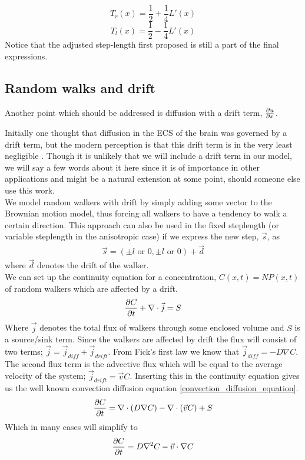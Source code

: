 \begin{equation}\label{farnell_and_gibson_4}
T_r(x) = \frac{1}{2} +\frac{1}{4}L'(x)
\end{equation}
\begin{equation}\label{farnell_and_gibson_5}
T_l(x) = \frac{1}{2} -\frac{1}{4}L'(x)
\end{equation}
Notice that the adjusted step-length first proposed is still a part of the final expressions.


\subsection{Random walks and drift}\label{random_walks_and_drift}

Another point which should be addressed is diffusion with a drift term, $\frac{\partial u}{\partial x}$. 

Initially one thought that diffusion in the ECS of the brain was governed by a drift term, but the modern perception is that this drift term is in the very least negligible \cite{nicholson2001diffusion}. 
Though it is unlikely that we will include a drift term in our model, we will say a few words about it here since it is of importance in other applications and might be a natural extension at some point, should someone else use this work.\\
We model random walkers with drift by simply adding some vector to the Brownian motion model, thus forcing all walkers to have a tendency to walk a certain direction. 
This approach can also be used in the fixed steplength (or variable steplength in the anisotropic case)  if we express the new step, $\vec{s}$, as
\begin{align*}
 \vec{s} = (\pm l \text{ or }0,\pm l \text{ or }0) +\vec{d}
\end{align*}
where $\vec{d}$ denotes the drift of the walker.\\
We can set up the continuity equation for a concentration, $C(x,t) = NP(x,t)$ of random walkers which are affected by a drift.
\begin{equation}
 \frac{\partial C}{\partial t} +\nabla\cdot\vec{j} = S
\end{equation}
Where $\vec{j}$ denotes the total flux of walkers through some enclosed volume and $S$ is a source/sink term. 
Since the walkers are affected by drift the flux will consist of two terms; $\vec{j} = \vec{j}_{diff}+\vec{j}_{drift}$. 
From Fick's first law we know that $\vec{j}_{diff} = -D\nabla C$. 
The second flux term is the advective flux which will be equal to the average velocity of the system; $\vec{j}_{drift} = \vec{v}C$. 
Inserting this in the continuity equation gives us the well known convection diffusion equation \eqref{convection_diffusion_equation}.
\begin{equation}\label{convection_diffusion_equation}
 \frac{\partial C}{\partial t} = \nabla\cdot\left(D\nabla C\right)-\nabla\cdot\left(\vec{v}C\right) + S
\end{equation}
Which in many cases will simplify to
\begin{equation}
 \frac{\partial C}{\partial t} = D\nabla^2 C-\vec{v}\cdot\nabla C
\end{equation}

